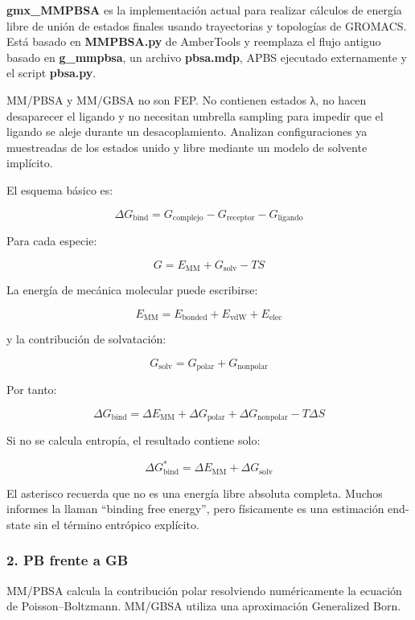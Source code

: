 \documentclass[
  spanish,
  11pt,
  a4paper]{article}
\begin{document}
\textbf{gmx\_MMPBSA} es la implementación actual para realizar cálculos
de energía libre de unión de estados finales usando trayectorias y
topologías de GROMACS. Está basado en \textbf{MMPBSA.py} de AmberTools y
reemplaza el flujo antiguo basado en \textbf{g\_mmpbsa}, un archivo
\textbf{pbsa.mdp}, APBS ejecutado externamente y el script
\textbf{pbsa.py}.

MM/PBSA y MM/GBSA no son FEP. No contienen estados λ, no hacen
desaparecer el ligando y no necesitan umbrella sampling para impedir que
el ligando se aleje durante un desacoplamiento. Analizan configuraciones
ya muestreadas de los estados unido y libre mediante un modelo de
solvente implícito.

El esquema básico es:

\[
\Delta G_{\mathrm{bind}}
=
G_{\mathrm{complejo}}
-
G_{\mathrm{receptor}}
-
G_{\mathrm{ligando}}
\]

Para cada especie:

\[
G=
E_{\mathrm{MM}}
+
G_{\mathrm{solv}}
-
TS
\]

La energía de mecánica molecular puede escribirse:

\[
E_{\mathrm{MM}}
=
E_{\mathrm{bonded}}
+
E_{\mathrm{vdW}}
+
E_{\mathrm{elec}}
\]

y la contribución de solvatación:

\[
G_{\mathrm{solv}}
=
G_{\mathrm{polar}}
+
G_{\mathrm{nonpolar}}
\]

Por tanto:

\[
\Delta G_{\mathrm{bind}}
=
\Delta E_{\mathrm{MM}}
+
\Delta G_{\mathrm{polar}}
+
\Delta G_{\mathrm{nonpolar}}
-
T\Delta S
\]

Si no se calcula entropía, el resultado contiene solo:

\[
\Delta G_{\mathrm{bind}}^{*}
=
\Delta E_{\mathrm{MM}}
+
\Delta G_{\mathrm{solv}}
\]

El asterisco recuerda que no es una energía libre absoluta completa.
Muchos informes la llaman ``binding free energy'', pero físicamente es
una estimación end-state sin el término entrópico explícito.

\subsubsection{2. PB frente a GB}\label{pb-frente-a-gb}

MM/PBSA calcula la contribución polar resolviendo numéricamente la
ecuación de Poisson--Boltzmann. MM/GBSA utiliza una aproximación
Generalized Born.
\end{document}
